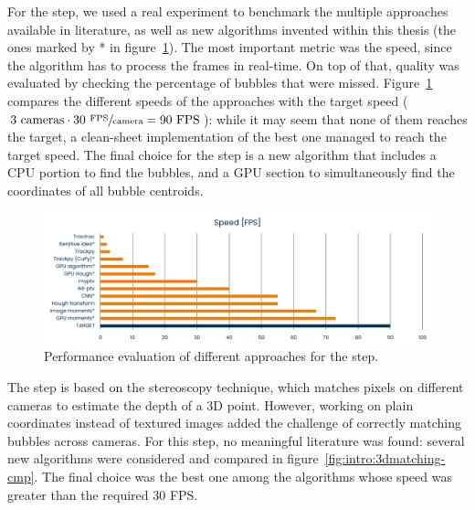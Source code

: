 
For the \locate* step, we used a real experiment to benchmark the multiple approaches available in literature, as well as new algorithms invented within this thesis (the ones marked by * in figure~\ref{fig:intro:locate-speed}).
The most important metric was the speed, since the algorithm has to process the frames in real-time.
On top of that, quality was evaluated by checking the percentage of bubbles that were missed.
Figure~\ref{fig:intro:locate-speed} compares the different speeds of the approaches with the target speed ($3~\textnormal{cameras} \cdot 30~\sfrac{\textnormal{FPS}}{\textnormal{camera}} = 90~\textnormal{FPS}$): while it may seem that none of them reaches the target, a clean-sheet implementation of the best one managed to reach the target speed.
The final choice for the \locate* step is a new algorithm that includes a CPU portion to find the bubbles, and a GPU section to simultaneously find the coordinates of all bubble centroids.

\begin{figure}
	\centerline{\includegraphics[width=\textwidth]{images/locate-speed-comparison.png}}
	\caption{\centering Performance evaluation of different approaches for the \locate* step.}
	\label{fig:intro:locate-speed}
\end{figure}

The \match* step is based on the stereoscopy technique, which matches pixels on different cameras to estimate the depth of a 3D point.
However, working on plain coordinates instead of textured images added the challenge of correctly matching bubbles across cameras.
For this step, no meaningful literature was found: several new algorithms were considered and compared in figure~\ref{fig:intro:3dmatching-cmp}.
The final choice was the best one among the algorithms whose speed was greater than the required 30 FPS.

